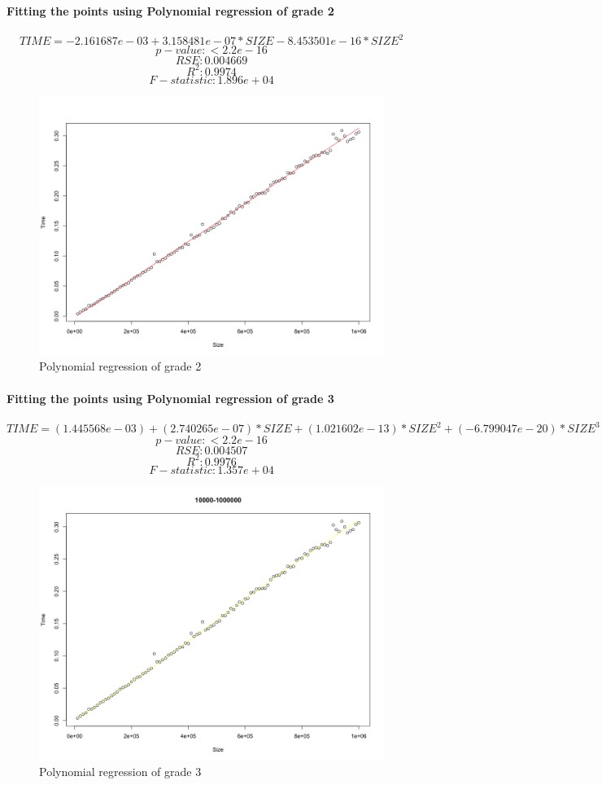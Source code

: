 \documentclass[14pt, oneside]{article}
\begin{document}
\paragraph{Fitting the points using Polynomial regression of grade 2}
$$ TIME = -2.161687e-03 + 3.158481e-07*SIZE  -8.453501e-16*SIZE^{2}$$
$$ p-value: < 2.2e-16 $$
$$ RSE: 0.004669 $$
$$ R^{2}:  0.9974 $$
$$ F-statistic: 1.896e+04 $$

\begin{figure}[H]
\centering
\includegraphics[width=\linewidth]{Rplot01.png}
\caption{Polynomial regression of grade 2}
\end{figure}

\paragraph{Fitting the points using Polynomial regression of grade 3}
$$ TIME = (1.445568e-03 ) + (2.740265e-07)*SIZE  +(1.021602e-13 )*SIZE^{2} + (-6.799047e-20)*SIZE^{3}$$
$$ p-value: < 2.2e-16 $$
$$ RSE: 0.004507 $$
$$ R^{2}:  0.9976 $$
$$ F-statistic: 1.357e+04$$

\begin{figure}[H]
\centering
\includegraphics[width=\linewidth]{Rplot02.png}
\caption{Polynomial regression of grade 3}
\end{figure}
\end{document}
